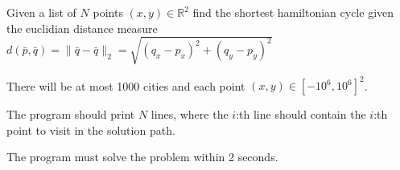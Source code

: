 Given a list of $N$ points $(x,y) \in \mathbb{R}^2$ 
find the shortest hamiltonian cycle given the 
euclidian distance measure~\cite{wikipedia:euclidean_distance} 
$d(\bar{p},\bar{q})=\|\bar{q}-\bar{q}\|_2=
\sqrt{(q_x-p_x)^2+(q_y-p_y)^2}$

There will be at most 1000 cities and each point $(x, y) \in \left[-10^6,10^6\right]^2$.

The program should print $N$ lines, where the $i$:th line should contain 
the $i$:th point to visit in the solution path.

The program must solve the problem within 2 seconds.

